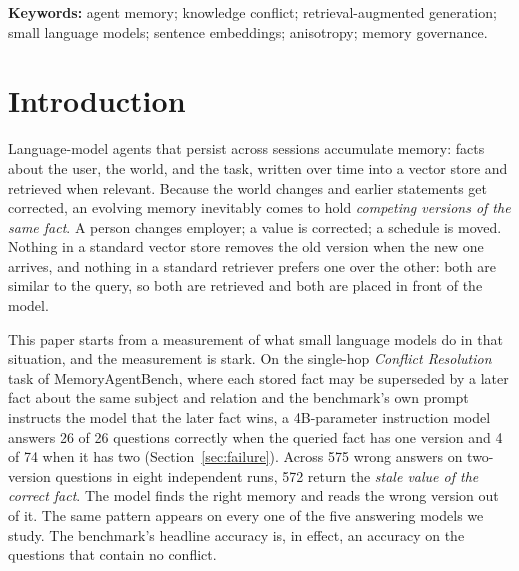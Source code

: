 \documentclass[journal=jcisd8,manuscript=article]{achemso}
\begin{document}
\newcommand{\figslot}[2]{%
  \fbox{\parbox[c][4.2cm][c]{0.90\linewidth}{\centering\textbf{[INSERT YOUR #1 HERE]}\\[0.6em]#2}}}


\noindent\textbf{Keywords:} agent memory; knowledge conflict; retrieval-augmented generation; small language models; sentence embeddings; anisotropy; memory governance.

\section{Introduction}

Language-model agents that persist across sessions accumulate memory: facts about the user, the world, and the task, written over time into a vector store and retrieved when relevant. Because the world changes and earlier statements get corrected, an evolving memory inevitably comes to hold \emph{competing versions of the same fact}. A person changes employer; a value is corrected; a schedule is moved. Nothing in a standard vector store removes the old version when the new one arrives, and nothing in a standard retriever prefers one over the other: both are similar to the query, so both are retrieved and both are placed in front of the model.

This paper starts from a measurement of what small language models do in that situation, and the measurement is stark. On the single-hop \emph{Conflict Resolution} task of MemoryAgentBench, where each stored fact may be superseded by a later fact about the same subject and relation and the benchmark's own prompt instructs the model that the later fact wins, a 4B-parameter instruction model answers 26 of 26 questions correctly when the queried fact has one version and 4 of 74 when it has two (Section~\ref{sec:failure}). Across 575 wrong answers on two-version questions in eight independent runs, 572 return the \emph{stale value of the correct fact}. The model finds the right memory and reads the wrong version out of it. The same pattern appears on every one of the five answering models we study. The benchmark's headline accuracy is, in effect, an accuracy on the questions that contain no conflict.
\end{document}

